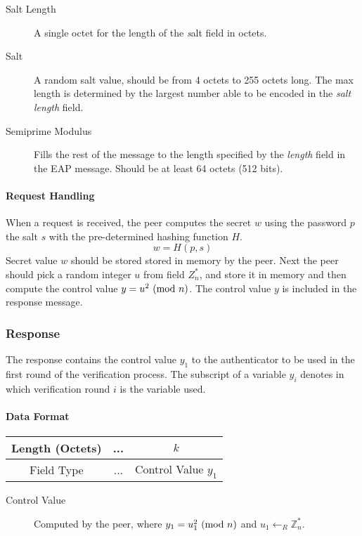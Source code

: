 \begin{description}
	\item[Salt Length] A single octet for the length of the \textit salt field in octets.
	\item[Salt] A random salt value, should be from 4 octets to 255 octets long.
The max length is determined by the largest number able to be encoded in the \textit {salt length} field.
	\item[Semiprime Modulus] Fills the rest of the message to the length specified by the \textit{length} field in the EAP message. 
Should be at least 64 octets (512 bits).
\end{description}

\paragraph{Request Handling} When a request is received, the peer computes the secret $w$ using the password $p$ the salt $s$ with the pre-determined hashing function $H$.
$$w = H(p, s)$$
Secret value $w$ should be stored stored in memory by the peer. 
Next the peer should pick a random integer $u$ from field $Z^*_n$, and store it in memory and then compute the control value $y = u^2 \ (\mathrm{mod}\ n)$.
The control value $y$ is included in the response message.

\subsubsection{Response}
The response contains the control value $y_1$ to the authenticator to be used in the first round of the verification process.
The subscript of a variable $y_i$ denotes in which verification round $i$ is the variable used.

\paragraph{Data Format}

\begin{center}
\begin{tabular}{|c|c|c|}
	\hline
	Length (Octets) & ... & $k$ \\
	\hline
	Field Type & ... & Control Value $y_1$\\
	\hline
\end{tabular}
\end{center}

\bigskip

\begin{description}
	\item[Control Value] Computed by the peer, where $y_1 = u_1^2 \ (\mathrm{mod}\ n)$ and $u_1 \leftarrow_R \mathbb{Z}^*_n$.
\end{description}

